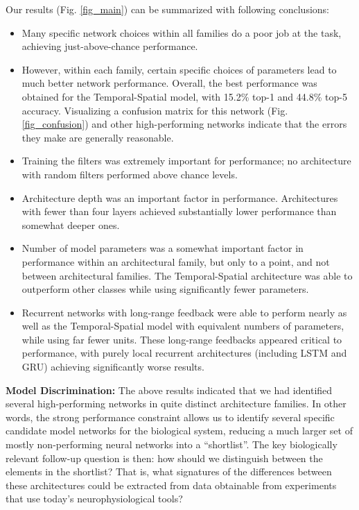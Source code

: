 Our results (Fig. \ref{fig_main}) can be summarized with following conclusions:

\begin{itemize}[leftmargin=*,itemsep=0ex,topsep=1ex]
   \item Many specific network choices within all families do a poor job at the task, achieving just-above-chance performance.
   \item However, within each family, certain specific choices of parameters lead to much better network performance.
   Overall, the best performance was obtained for the Temporal-Spatial model, with 15.2\% top-1 and 44.8\% top-5 accuracy.
   Visualizing a confusion matrix for this network (Fig. \ref{fig_confusion})  and other high-performing networks indicate that the errors they make are generally reasonable.
   \item Training the filters was extremely important for performance; no architecture with random filters performed above chance levels.
   \item Architecture depth was an important factor in performance. Architectures with fewer than four layers achieved substantially lower performance than somewhat deeper ones.
   \item Number of model parameters was a somewhat important factor in performance within an architectural family, but only to a point, and not between architectural families.
   The Temporal-Spatial architecture was able to outperform other classes while using significantly fewer parameters.
   \item Recurrent networks with long-range feedback were able to perform nearly as well as the Temporal-Spatial model with equivalent numbers of parameters, while using far fewer units.
   These long-range feedbacks appeared critical to performance, with purely local recurrent architectures (including LSTM and GRU) achieving significantly worse results.
\end{itemize}

\textbf{Model Discrimination:}  The above results indicated that we had identified several high-performing networks in quite distinct architecture families.
In other words, the strong performance constraint allows us to identify several specific candidate model networks for the biological system, reducing a much larger set of mostly non-performing neural networks into a ``shortlist''.
The key biologically relevant follow-up question is then: how should we distinguish between the elements in the shortlist? 
That is, what signatures of the differences between these architectures could be extracted from data obtainable from experiments that use today's neurophysiological tools?

